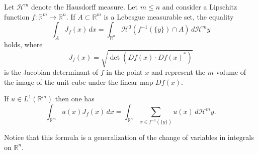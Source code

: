 \documentclass[12pt]{article}
\newcommand{\R}{\mathbb R}
\newcommand{\HH}{\mathcal H}
\theoremstyle{remark}
\begin{document}
Let $\HH^m$ denote the Hausdorff measure. Let $m\le n$ and consider a Lipschitz function $f\colon \R^m \to \R^n$.
If $A\subset \R^m$ is a Lebesgue measurable set, the equality
\[
  \int_A J_f(x) \,dx = \int_{\R^n} \HH^0(f^{-1}(\{y\})\cap A) \, d\HH^m y
\]
holds, where 
\[
J_f(x) = \sqrt{\det(Df(x)\cdot Df(x)^*)}
\]
is the Jacobian determinant of $f$ in the point $x$ and represent the $m$-volume of the image of the unit cube under the linear map $Df(x)$.

If $u\in L^1(\R^m)$ then one has
\[
  \int_{\R^m} u(x) J_f(x)\, dx = \int_{\R^n}\sum_{x\in f^{-1}(\{y\})} u(x)\, d\HH^m y.
\]

Notice that this formula is a generalization of the change of variables in integrals on $\R^n$.
\end{document}

